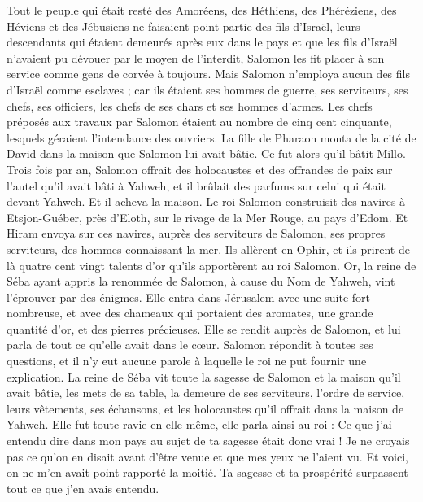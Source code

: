 \begin{multicols}{2}
Tout le peuple qui était resté des Amoréens, des Héthiens, des Phéréziens, des Héviens et des Jébusiens ne faisaient point partie des fils d'Israël,
leurs descendants qui étaient demeurés après eux dans le pays et que les fils d'Israël n'avaient pu dévouer par le moyen de l'interdit, Salomon les fit placer à son service comme gens de corvée à toujours.
Mais Salomon n’employa aucun des fils d'Israël comme esclaves ; car ils étaient ses hommes de guerre, ses serviteurs, ses chefs, ses officiers, les chefs de ses chars et ses hommes d'armes.
Les chefs préposés aux travaux par Salomon étaient au nombre de cinq cent cinquante, lesquels géraient l'intendance des ouvriers.
La fille de Pharaon monta de la cité de David dans la maison que Salomon lui avait bâtie. Ce fut alors qu’il bâtit Millo.
Trois fois par an, Salomon offrait des holocaustes et des offrandes de paix sur l'autel qu'il avait bâti à Yahweh, et il brûlait des parfums sur celui qui était devant Yahweh. Et il acheva la maison.
Le roi Salomon construisit des navires à Etsjon-Guéber, près d'Eloth, sur le rivage de la Mer Rouge, au pays d'Edom.
Et Hiram envoya sur ces navires, auprès des serviteurs de Salomon, ses propres serviteurs, des hommes connaissant la mer.
Ils allèrent en Ophir, et ils prirent de là quatre cent vingt talents d'or qu’ils apportèrent au roi Salomon.
\VerseOne{}Or, la reine de Séba ayant appris la renommée de Salomon, à cause du Nom de Yahweh, vint l’éprouver par des énigmes.
Elle entra dans Jérusalem avec une suite fort nombreuse, et avec des chameaux qui portaient des aromates, une grande quantité d'or, et des pierres précieuses. Elle se rendit auprès de Salomon, et lui parla de tout ce qu'elle avait dans le cœur.
Salomon répondit à toutes ses questions, et il n’y eut aucune parole à laquelle le roi ne put fournir une explication.
La reine de Séba vit toute la sagesse de Salomon et la maison qu'il avait bâtie,
les mets de sa table, la demeure de ses serviteurs, l’ordre de service, leurs vêtements, ses échansons, et les holocaustes qu'il offrait dans la maison de Yahweh.
Elle fut toute ravie en elle-même, elle parla ainsi au roi : Ce que j'ai entendu dire dans mon pays au sujet de ta sagesse était donc vrai !
Je ne croyais pas ce qu’on en disait avant d’être venue et que mes yeux ne l'aient vu. Et voici, on ne m'en avait point rapporté la moitié. Ta sagesse et ta prospérité surpassent tout ce que j'en avais entendu.

\end{multicols}
